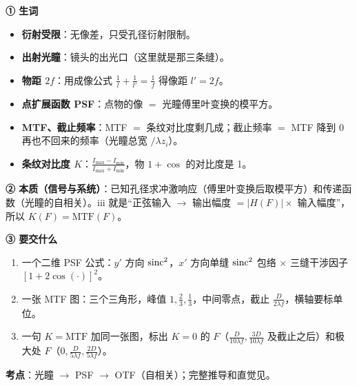 \label{rd:v-3slit}
\begin{idea}[读题：概念与要交什么]
\textbf{① 生词}
\begin{itemize}
\item \textbf{衍射受限}：无像差，只受孔径衍射限制。
\item \textbf{出射光瞳}：镜头的出光口（这里就是那三条缝）。
\item \textbf{物距 $2f$}：用成像公式 $\frac1l+\frac1{l'}=\frac1f$ 得像距 $l'=2f$。
\item \textbf{点扩展函数 PSF}：点物的像 $=$ 光瞳傅里叶变换的模平方。
\item \textbf{MTF、截止频率}：MTF $=$ 条纹对比度剩几成；截止频率 $=$ MTF 降到 0 再也不回来的频率（光瞳总宽 $/\lambda z_i$）。
\item \textbf{条纹对比度 $K$}：$\frac{I_{\max}-I_{\min}}{I_{\max}+I_{\min}}$，物 $1+\cos$ 的对比度是 1。
\end{itemize}
\textbf{② 本质（信号与系统）}：已知孔径求冲激响应（傅里叶变换后取模平方）和传递函数（光瞳的自相关）。iii 就是“正弦输入 $\to$ 输出幅度 $=|H(F)|\times$ 输入幅度”，所以 $K(F)=\mathrm{MTF}(F)$。

\textbf{③ 要交什么}
\begin{enumerate}[label=\roman*.]
\item 一个二维 PSF 公式：$y'$ 方向 $\operatorname{sinc}^2$，$x'$ 方向单缝 $\operatorname{sinc}^2$ 包络 $\times$ 三缝干涉因子 $[1+2\cos(\cdot)]^2$。
\item 一张 MTF 图：三个三角形，峰值 $1,\frac23,\frac13$，中间零点，截止 $\frac{D}{2\lambda f}$，横轴要标单位。
\item 一句 $K=\mathrm{MTF}$ 加同一张图，标出 $K=0$ 的 $F$（$\frac{D}{10\lambda f},\frac{3D}{10\lambda f}$ 及截止之后）和极大处 $F$（$0,\frac{D}{5\lambda f},\frac{2D}{5\lambda f}$）。
\end{enumerate}
\end{idea}


\textbf{考点}：光瞳 $\to$ PSF $\to$ OTF（自相关）；完整推导和直觉见\pageref{ex:3slit}。

